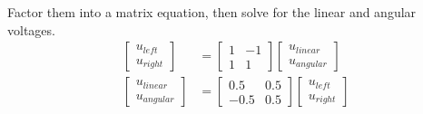 Factor them into a matrix equation, then solve for the linear and angular
voltages.
\begin{align*}
  \begin{bmatrix}
    u_{left} \\
    u_{right}
  \end{bmatrix} &=
  \begin{bmatrix}
    1 & -1 \\
    1 & 1
  \end{bmatrix}
  \begin{bmatrix}
    u_{linear} \\
    u_{angular}
  \end{bmatrix} \\
  \begin{bmatrix}
    u_{linear} \\
    u_{angular}
  \end{bmatrix} &=
  \begin{bmatrix}
    0.5 & 0.5 \\
    -0.5 & 0.5
  \end{bmatrix}
  \begin{bmatrix}
    u_{left} \\
    u_{right}
  \end{bmatrix}
\end{align*}

